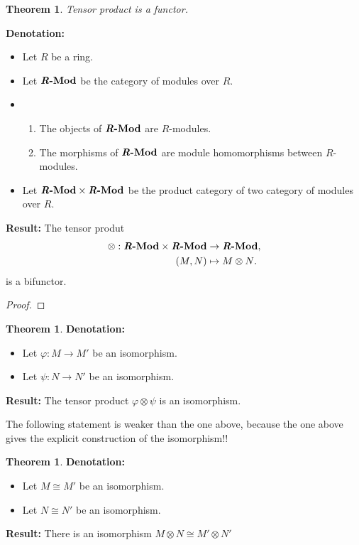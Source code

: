 \documentclass[a4paper]{book}
\theoremstyle{definition}
\newtheorem{theorem}[definition]{Theorem}
\begin{document}
\begin{theorem}
    \textit{Tensor product is a functor.}

    \noindent\textbf{Denotation: } \begin{itemize}
        \item Let \(R\) be a ring.
        \item Let \(\textbf{\textit{R}-Mod}\) be the category of modules over \(R\).
        \item \begin{enumerate}
            \item The objects of \(\textbf{\textit{R}-Mod}\) are \(R\)-modules.
            \item The morphisms of \(\textbf{\textit{R}-Mod}\) are module homomorphisms between \(R\)-modules.
        \end{enumerate}
        \item Let \(\textbf{\textit{R}-Mod} \times \textbf{\textit{R}-Mod}\) be the product category of two category of modules over \(R\).
    \end{itemize}

    \noindent\textbf{Result: }The tensor produt
    \begin{align*}
        \otimes: \textbf{\textit{R}-Mod} \times \textbf{\textit{R}-Mod} &\rightarrow \textbf{\textit{R}-Mod}, \\
        (M, N) &\mapsto M \otimes N \text{.}
    \end{align*}
    is a bifunctor.
\end{theorem}

\begin{proof}
    
\end{proof}


\begin{theorem}
    \noindent\textbf{Denotation: } \begin{itemize}
        \item Let \(\varphi: M \rightarrow M'\) be an isomorphism.
        \item Let \(\psi: N \rightarrow N'\) be an isomorphism.
    \end{itemize}
    \noindent\textbf{Result: } The tensor product \(\varphi \otimes \psi\) is an isomorphism.
\end{theorem}


The following statement is weaker than the one above, because the one above gives the explicit construction of the isomorphism!!
\begin{theorem}
    \noindent\textbf{Denotation: } \begin{itemize}
        \item Let \(M \cong M'\) be an isomorphism.
        \item Let \(N \cong N'\) be an isomorphism.
    \end{itemize}
    \noindent\textbf{Result: } There is an isomorphism \(M \otimes N \cong M' \otimes N'\)
\end{theorem}
\end{document}
